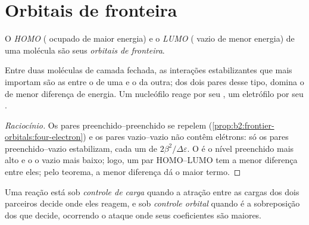 \section{Orbitais de fronteira}

\begin{definition}\label{def:b2:frontier-orbitals:frontier}
O \emph{HOMO} ( ocupado de maior energia) e o
\emph{LUMO} ( vazio de menor energia) de uma
molécula são seus \emph{orbitais de fronteira}.
\end{definition}

\begin{proposition}\label{prop:b2:frontier-orbitals:dominant}
Entre duas moléculas de camada fechada, as interações estabilizantes que mais
importam são as entre o  de uma e o  da outra; dos dois pares desse
tipo, domina o de menor diferença de energia. Um nucleófilo reage por seu
, um eletrófilo por seu .
\end{proposition}

\begin{proof}[Raciocínio]
Os pares preenchido--preenchido se repelem (\cref{prop:b2:frontier-orbitals:four-electron}) e os
pares vazio--vazio não contêm elétrons: só os pares preenchido--vazio
estabilizam, cada um de $2\beta^2/\Delta\varepsilon$. O  é o nível preenchido mais alto e o
 o vazio mais baixo; logo, um par HOMO--LUMO tem a menor diferença entre
eles; pelo teorema, a menor diferença dá o maior termo.
\end{proof}

\begin{definition}\label{def:b2:frontier-orbitals:control}
Uma reação está sob \emph{controle de carga} quando a
atração entre as cargas dos dois parceiros decide onde eles reagem, e sob
\emph{controle orbital} quando é a sobreposição dos  que decide, ocorrendo o ataque onde seus coeficientes são maiores.
\end{definition}

